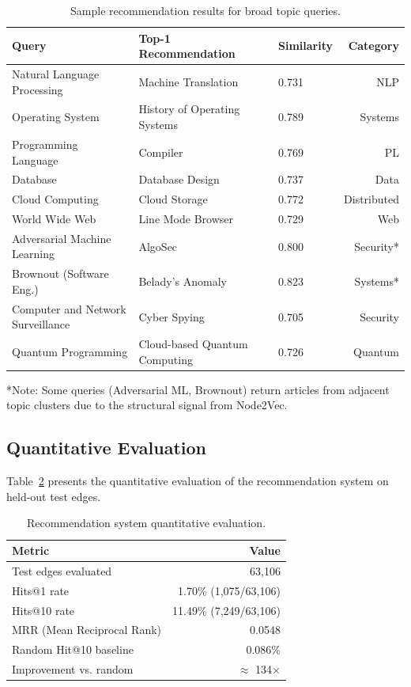 \begin{table}[htbp]
\centering
\footnotesize
\caption{Sample recommendation results for broad topic queries.}
\label{tab:recommendation-results}
\begin{tabular}{lllr}
\toprule
\textbf{Query} & \textbf{Top-1 Recommendation} & \textbf{Similarity} & \textbf{Category} \\
\midrule
Natural Language Processing & Machine Translation & 0.731 & NLP \\
Operating System & History of Operating Systems & 0.789 & Systems \\
Programming Language & Compiler & 0.769 & PL \\
Database & Database Design & 0.737 & Data \\
Cloud Computing & Cloud Storage & 0.772 & Distributed \\
World Wide Web & Line Mode Browser & 0.729 & Web \\
Adversarial Machine Learning & AlgoSec & 0.800 & Security* \\
Brownout (Software Eng.) & Belady's Anomaly & 0.823 & Systems* \\
Computer and Network Surveillance & Cyber Spying & 0.705 & Security \\
Quantum Programming & Cloud-based Quantum Computing & 0.726 & Quantum \\
\bottomrule
\end{tabular}
\end{table}

*Note: Some queries (Adversarial ML, Brownout) return articles from adjacent topic clusters due to the structural signal from Node2Vec.

\subsection{Quantitative Evaluation}

Table~\ref{tab:quantitative-eval} presents the quantitative evaluation of the recommendation system on held-out test edges.

\begin{table}[htbp]
\centering
\caption{Recommendation system quantitative evaluation.}
\label{tab:quantitative-eval}
\begin{tabular}{lr}
\toprule
\textbf{Metric} & \textbf{Value} \\
\midrule
Test edges evaluated & 63,106 \\
Hits@1 rate & 1.70\% (1,075/63,106) \\
Hits@10 rate & 11.49\% (7,249/63,106) \\
MRR (Mean Reciprocal Rank) & 0.0548 \\
Random Hit@10 baseline & 0.086\% \\
Improvement vs. random & $\approx$ 134$\times$ \\
\bottomrule
\end{tabular}
\end{table}

